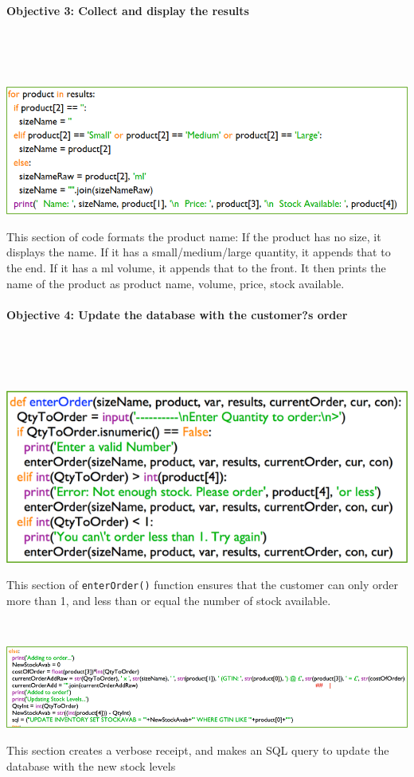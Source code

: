 \documentclass[a4paper]{article}
\begin{document}
\paragraph{Objective 3: Collect and display the results} ~\par ~\par
\noindent\includegraphics{task2_obj3_1.png} \par
This section of code formats the product name: If the product has no size, it displays the name. If it has a small/medium/large quantity, it appends that to the end. If it has a ml volume, it appends that to the front. It then prints the name of the product as product name, volume, price, stock available.
\newpage
\paragraph{Objective 4: Update the database with the customer?s order} ~\par ~\par
\noindent\includegraphics{task2_obj4_1.png} \par 
This section of \verb|enterOrder()| function ensures that the customer can only order more than 1, and less than or equal the number of stock available. ~\par ~\par
\noindent\includegraphics{task2_obj4_2.png} \par
This section creates a verbose receipt, and makes an SQL query to update the database with the new stock levels
\end{document}
